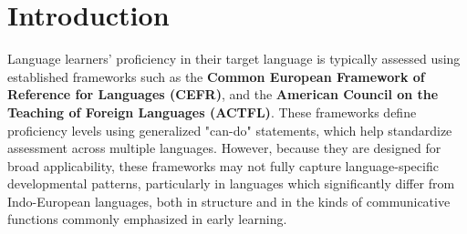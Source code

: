 \chapter{Introduction}










Language learners' proficiency in their target language is typically assessed using established frameworks such as
the \textbf{Common European Framework of Reference for Languages (CEFR)}, and the
\textbf{American Council on the Teaching of Foreign Languages (ACTFL)}. These frameworks define proficiency levels
using generalized "can-do" statements, which help standardize assessment across multiple languages. However,
because they are designed for broad
applicability, these frameworks may
not fully capture language-specific developmental patterns, particularly in languages which significantly differ
from Indo-European languages, both in structure and in the kinds of
communicative functions commonly emphasized in early learning.

